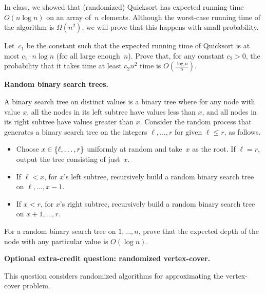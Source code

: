 \documentclass[11pt,addpoints,answers]{exam}
\begin{document}
\begin{questions}
  In class, we showed that (randomized) Quicksort has expected running time $O(n \log n)$ on an array of~$n$ elements.
  Although the worst-case running time of the algorithm is $\Omega(n^2)$, we will prove that this happens with small probability.
    
  Let~$c_1$ be the constant such that the expected running time of Quicksort is at most $c_1 \cdot n\log n$ (for all large enough~$n$).
  Prove that, for any constant $c_2 >0$, the probability that it takes time at least $c_2 n^2$ time is $O(\frac{\log n}{n})$.
      
  \begin{solution}
    
  \end{solution}

  \question[12] \textbf{Random binary search trees.}

  A binary search tree on distinct values is a binary tree where for any node with value $x$, all the nodes in its left subtree have values less than $x$, and all nodes in its right subtree have values greater than $x$.
  Consider the random process that generates a binary search tree on the integers $\ell,\ldots,r$ for given $\ell \leq r$, as follows.
  \begin{itemize}
  \item Choose $x \in \{\ell,\dots,r\}$ uniformly at random and take~$x$ as the root.
    If $\ell=r$, output the tree consisting of just~$x$.
  \item If $\ell < x$, for $x$'s left subtree, recursively build a random binary search tree on $\ell,\ldots,x-1$.
  \item If $x < r$, for $x$'s right subtree, recursively build a random binary search tree on $x+1,\ldots,r$.
  \end{itemize}

  For a random binary search tree on $1, \ldots, n$, prove that the expected depth of the node with any particular value is $O(\log n)$.
  
    
  \begin{solution}
    
  \end{solution}

  \pagebreak
  
  \bonusquestion[5] \textbf{Optional extra-credit question: randomized vertex-cover.}

  This question considers randomized algorithms for approximating the vertex-cover problem.
    

\end{questions}
\end{document}
